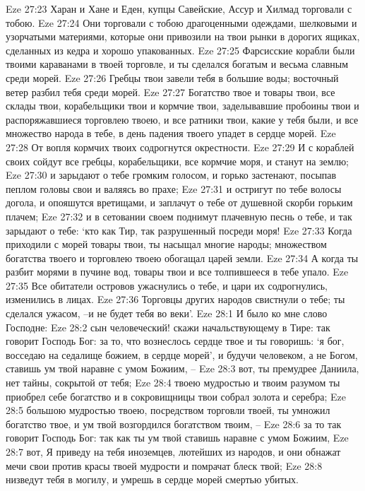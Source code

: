 Eze 27:23  Харан и Хане и Еден, купцы Савейские, Ассур и Хилмад торговали с тобою.
Eze 27:24  Они торговали с тобою драгоценными одеждами, шелковыми и узорчатыми материями, которые они привозили на твои рынки в дорогих ящиках, сделанных из кедра и хорошо упакованных.
Eze 27:25  Фарсисские корабли были твоими караванами в твоей торговле, и ты сделался богатым и весьма славным среди морей.
Eze 27:26  Гребцы твои завели тебя в большие воды; восточный ветер разбил тебя среди морей.
Eze 27:27  Богатство твое и товары твои, все склады твои, корабельщики твои и кормчие твои, заделывавшие пробоины твои и распоряжавшиеся торговлею твоею, и все ратники твои, какие у тебя были, и все множество народа в тебе, в день падения твоего упадет в сердце морей.
Eze 27:28  От вопля кормчих твоих содрогнутся окрестности.
Eze 27:29  И с кораблей своих сойдут все гребцы, корабельщики, все кормчие моря, и станут на землю;
Eze 27:30  и зарыдают о тебе громким голосом, и горько застенают, посыпав пеплом головы свои и валяясь во прахе;
Eze 27:31  и остригут по тебе волосы догола, и опояшутся вретищами, и заплачут о тебе от душевной скорби горьким плачем;
Eze 27:32  и в сетовании своем поднимут плачевную песнь о тебе, и так зарыдают о тебе: `кто как Тир, так разрушенный посреди моря!
Eze 27:33  Когда приходили с морей товары твои, ты насыщал многие народы; множеством богатства твоего и торговлею твоею обогащал царей земли.
Eze 27:34  А когда ты разбит морями в пучине вод, товары твои и все толпившееся в тебе упало.
Eze 27:35  Все обитатели островов ужаснулись о тебе, и цари их содрогнулись, изменились в лицах.
Eze 27:36  Торговцы других народов свистнули о тебе; ты сделался ужасом, --и не будет тебя во веки'.
Eze 28:1  И было ко мне слово Господне:
Eze 28:2  сын человеческий! скажи начальствующему в Тире: так говорит Господь Бог: за то, что вознеслось сердце твое и ты говоришь: `я бог, восседаю на седалище божием, в сердце морей', и будучи человеком, а не Богом, ставишь ум твой наравне с умом Божиим, --
Eze 28:3  вот, ты премудрее Даниила, нет тайны, сокрытой от тебя;
Eze 28:4  твоею мудростью и твоим разумом ты приобрел себе богатство и в сокровищницы твои собрал золота и серебра;
Eze 28:5  большою мудростью твоею, посредством торговли твоей, ты умножил богатство твое, и ум твой возгордился богатством твоим, --
Eze 28:6  за то так говорит Господь Бог: так как ты ум твой ставишь наравне с умом Божиим,
Eze 28:7  вот, Я приведу на тебя иноземцев, лютейших из народов, и они обнажат мечи свои против красы твоей мудрости и помрачат блеск твой;
Eze 28:8  низведут тебя в могилу, и умрешь в сердце морей смертью убитых.
